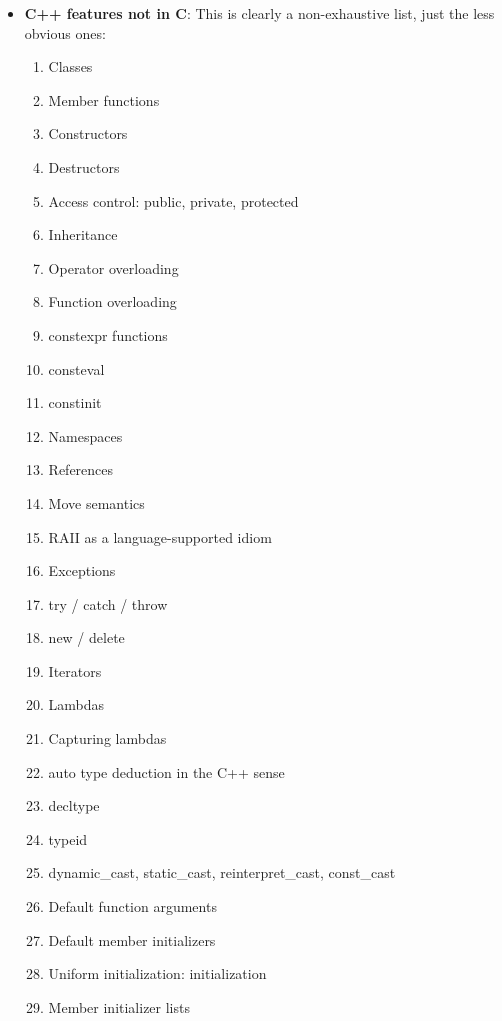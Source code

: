 \documentclass{report}
\begin{document}
    \begin{itemize}
        \item \textbf{C++ features not in C}: This is clearly a non-exhaustive list, just the less obvious ones:
            \begin{enumerate}
                \item Classes
                \item Member functions
                \item Constructors
                \item Destructors
                \item Access control: public, private, protected
                \item Inheritance
                \item Operator overloading
                \item Function overloading
                \item constexpr functions
                \item consteval
                \item constinit
                \item Namespaces
                \item References
                \item Move semantics
                \item RAII as a language-supported idiom
                \item Exceptions
                \item try / catch / throw
                \item new / delete
                \item Iterators
                \item Lambdas
                \item Capturing lambdas
                \item auto type deduction in the C++ sense
                \item decltype
                \item typeid
                \item dynamic\_cast, static\_cast, reinterpret\_cast, const\_cast
                \item Default function arguments
                \item Default member initializers
                \item Uniform initialization: {} initialization
                \item Member initializer lists

\end{enumerate}
\end{itemize}
\end{document}
